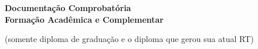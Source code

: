 \label{documentacao-probatoria-formacao}

\begin{center}
	\begin{LARGE}
		\textbf{Documentação Comprobatória\\
		\vspace{0.2in}
		Formação Acadêmica e Complementar}
	\end{LARGE}
\end{center}

\ifcomentarios
\begin{center}
	{\color{red}(somente diploma de graduação e o diploma que gerou sua atual RT)}
\end{center}
\fi